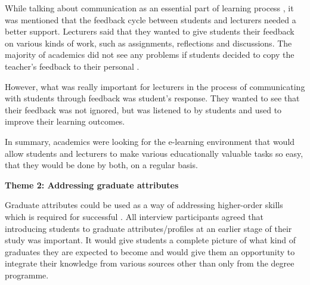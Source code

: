 While talking about communication as an essential part of learning process
\citep{Schaffert2008}, it was mentioned that the feedback cycle between students
and lecturers needed a better support. Lecturers said that they wanted to give
students their feedback on various kinds of work, such as assignments,
reflections and discussions. The majority of academics did not see any problems
if students decided to copy the teacher's feedback to their personal \ep.


However, what was really important for lecturers in the process of communicating
with students through feedback was student's response. They wanted to see that
their feedback was not ignored, but was listened to by students and used to
improve their learning outcomes.


In summary, academics were looking for the e-learning environment that would
allow students and lecturers to make various educationally valuable tasks so easy,
that they would be done by both, on a regular basis.

\textbf{Theme 2: Addressing graduate attributes}

Graduate attributes could be used as a way of addressing higher-order skills
which is required for successful \LLLs \citep{Hart1999}. All interview
participants agreed that introducing students to graduate attributes/profiles at
an earlier stage of their study was important. It would give students a
complete picture of what kind of graduates they are expected to become and would
give them an opportunity to integrate their knowledge from various sources other
than only from the degree programme.


